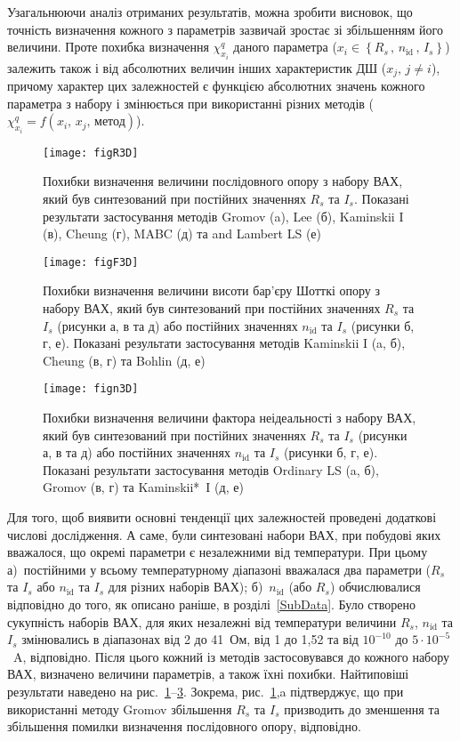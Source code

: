 Узагальнюючи аналіз отриманих результатів, можна зробити висновок, що точність визначення кожного з параметрів зазвичай зростає зі збільшенням його величини.
Проте похибка визначення $\chi^q_{x_i}$ даного параметра ($x_i\in\left\{R_s\,,\,n_\mathrm{id}\,,\, I_s\right\}$) залежить також і від абсолютних величин інших характеристик ДШ ($x_j,\,j\neq i$), причому характер цих залежностей є функцією абсолютних значень кожного параметра з набору і змінюється при використанні різних методів ($\chi^q_{x_i}=f(x_i,\,x_j,\,\text{метод})$).


\begin{figure}
\center
\texttt{[image: figR3D]}%
\caption{\label{figR3D}
Похибки визначення величини послідовного опору з набору ВАХ, який був синтезований при постійних значеннях $R_s$ та $I_s$.
Показані результати застосування методів Gromov (a), Lee (б), Kaminskii I (в), Cheung (г), MABC (д) та and Lambert LS (е)
}
\end{figure}

\begin{figure}
\center
\texttt{[image: figF3D]}%
\caption{\label{figF3D}
Похибки визначення величини висоти бар'єру Шотткі опору з набору ВАХ, який був синтезований при постійних значеннях $R_s$ та $I_s$ (рисунки а, в та д) або постійних значеннях $n_\mathrm{id}$ та $I_s$ (рисунки б, г, е).
Показані результати застосування методів Kaminskii I (a, б), Cheung (в, г) та Bohlin (д, е)
}
\end{figure}


\begin{figure}
\center
\texttt{[image: fign3D]}%
\caption{\label{fign3D}
Похибки визначення величини фактора неідеальності з набору ВАХ, який був синтезований при постійних значеннях $R_s$ та $I_s$ (рисунки а, в та д) або постійних значеннях $n_\mathrm{id}$ та $I_s$ (рисунки б, г, е).
Показані результати застосування методів Ordinary LS (a, б), Gromov (в, г) та Kaminskii*~I (д, е)
}
\end{figure}

Для того, щоб виявити основні тенденції цих залежностей проведені додаткові числові дослідження.
А саме, були синтезовані набори ВАХ, при побудові яких вважалося, що окремі параметри є незалежними від температури.
При цьому
а)~постійними у всьому температурному діапазоні вважалася два параметри ($R_s$ та $I_s$  або $n_\mathrm{id}$ та $I_s$ для різних наборів ВАХ);
б)~$n_\mathrm{id}$ (або $R_s$) обчислювалися відповідно до того, як описано раніше, в розділі~\ref{SubData}.
Було створено сукупність наборів ВАХ, для яких незалежні від температури величини $R_s$, $n_\mathrm{id}$ та $I_s$ змінювались в діапазонах від
2 до 41~Ом, від 1 до 1,52 та від $10^{-10}$ до $5\cdot10^{-5}$~A, відповідно.
Після цього кожний із методів застосовувався до кожного набору ВАХ, визначено величини параметрів, а також їхні похибки.
Найтиповіші результати наведено на рис.~\ref{figR3D}--\ref{fign3D}.
Зокрема, рис.~\ref{figR3D},a підтверджує, що при використанні методу Gromov збільшення $R_s$ та $I_s$ призводить до зменшення та збільшення помилки визначення послідовного опору, відповідно.


